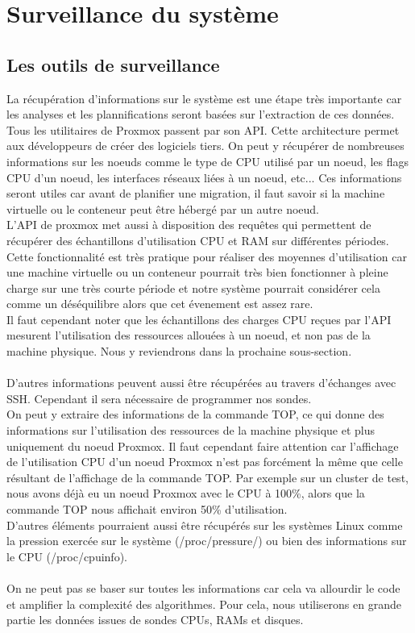 \documentclass[14pt]{extarticle}
\begin{document}
    \newpage



\section{Surveillance du système}
    \subsection{Les outils de surveillance}
    La récupération d'informations sur le système est une étape très importante car les analyses et les plannifications seront basées sur l'extraction de ces données. Tous les utilitaires de Proxmox passent par son API. Cette architecture permet aux développeurs de créer des logiciels tiers. On peut y récupérer de nombreuses informations sur les noeuds comme le type de CPU utilisé par un noeud, les flags CPU d'un noeud, les interfaces réseaux liées à un noeud, etc...  Ces informations seront utiles car avant de planifier une migration, il faut savoir si la machine virtuelle ou le conteneur peut être hébergé par un autre noeud.\\
    L'API de proxmox met aussi à disposition des requêtes qui permettent de récupérer des échantillons d'utilisation CPU et RAM sur différentes périodes. Cette fonctionnalité est très pratique pour réaliser des moyennes d'utilisation car une machine virtuelle ou un conteneur pourrait très bien fonctionner à pleine charge sur une très courte période et notre système pourrait considérer cela comme un déséquilibre alors que cet évenement est assez rare.\\
    Il faut cependant noter que les échantillons des charges CPU reçues par l'API mesurent l'utilisation des ressources allouées à un noeud, et non pas de la machine physique. Nous y reviendrons dans la prochaine sous-section.\\
    \\
    D'autres informations peuvent aussi être récupérées au travers d'échanges avec SSH. Cependant il sera nécessaire de programmer nos sondes.\\
    On peut y extraire des informations de la commande TOP, ce qui donne des informations sur l'utilisation des ressources de la machine physique et plus uniquement du noeud Proxmox. Il faut cependant faire attention car l'affichage de l'utilisation CPU d'un noeud Proxmox n'est pas forcément la même que celle résultant de l'affichage de la commande TOP. Par exemple sur un cluster de test, nous avons déjà eu un noeud Proxmox avec le CPU à 100\%, alors que la commande TOP nous affichait environ 50\% d'utilisation.\\
    D'autres éléments pourraient aussi être récupérés sur les systèmes Linux comme la pression  exercée sur le système (/proc/pressure/) \cite{kernel_psi} ou bien des informations sur le CPU (/proc/cpuinfo).\\
    \\
    On ne peut pas se baser sur toutes les informations car cela va allourdir le code et amplifier la complexité des algorithmes. Pour cela, nous utiliserons en grande partie les données issues de sondes CPUs, RAMs et disques.
    \newpage
\end{document}
